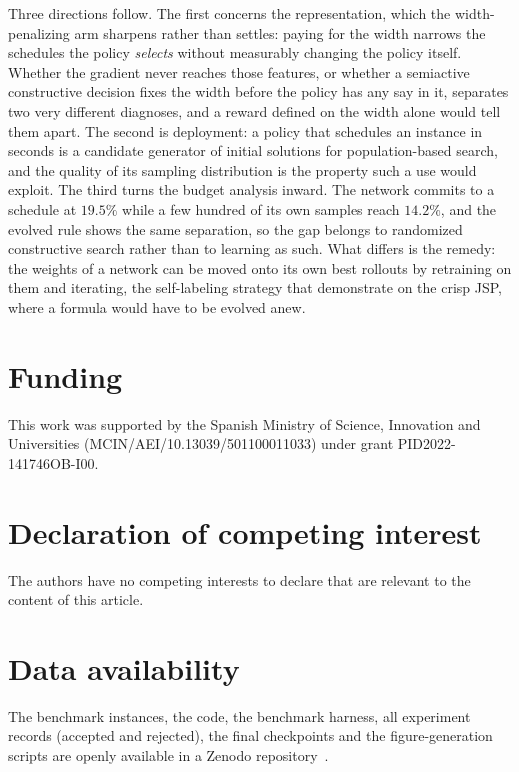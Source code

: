 \documentclass[preprint,12pt]{elsarticle}
\theoremstyle{definition}
\theoremstyle{remark}
\begin{document}
Three directions follow. The first concerns the representation, which
the width-penalizing arm sharpens rather than settles: paying for the
width narrows the schedules the policy \emph{selects} without
measurably changing the policy itself. Whether the gradient never
reaches those features, or whether a semiactive constructive decision
fixes the width before the policy has any say in it, separates two
very different diagnoses, and a reward defined on the width alone
would tell them apart. The second is deployment: a policy that
schedules an instance in seconds is a candidate generator of initial
solutions for population-based search, and the quality of its
sampling distribution is the property such a use would exploit. The
third turns the budget analysis inward. The network commits to a
schedule at $19.5\%$ while a few hundred of its own samples reach
$14.2\%$, and the evolved rule shows the same separation, so the gap
belongs to randomized constructive search rather than to learning as
such. What
differs is the remedy: the weights of a network can be moved onto its
own best rollouts by retraining on them and iterating, the
self-labeling strategy that \citet{Corsini2024} demonstrate on the
crisp JSP, where a formula would have to be evolved anew.

\section*{Funding}
This work was supported by the Spanish Ministry of
Science, Innovation and Universities
(MCIN/AEI/10.13039/501100011033) under grant PID2022-141746OB-I00.

\section*{Declaration of competing interest}
The authors have no competing interests
to declare that are relevant to the content of this article.

\section*{Data availability}
The benchmark instances, the code,
the benchmark harness, all experiment records (accepted and
rejected), the final checkpoints and the figure-generation scripts
are openly available in a Zenodo
repository~\citep{DiazDRLDataset2026}.
\end{document}
